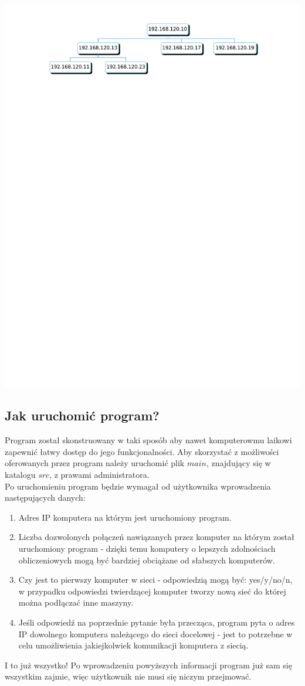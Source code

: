 \includegraphics[width=1.0\textwidth]{chart.jpg}

\subsection{Jak uruchomić program?}
Program został skonstruowany w taki sposób aby nawet komputerowmu laikowi zapewnić łatwy dostęp do jego funkcjonalności. Aby skorzystać z możliwości oferowanych przez program należy uruchomić plik $main$, znajdujący się w katalogu $src$, z prawami administratora.\\
\indent Po uruchomieniu program będzie wymagał od użytkownika wprowadzenia następujących danych:
\begin{enumerate}
\item Adres IP komputera na którym jest uruchomiony program.
\item Liczba dozwolonych połączeń nawiązanych przez komputer na którym został uruchomiony program - dzięki temu komputery o lepszych zdolnościach obliczeniowych mogą być bardziej obciążane od słabszych komputerów.
\item Czy jest to pierwszy komputer w sieci - odpowiedzią mogą być: yes/y/no/n, w przypadku odpowiedzi twierdzącej komputer tworzy nową sieć do której można podłączać inne maszyny.
\item Jeśli odpowiedź na poprzednie pytanie była przecząca, program pyta o adres IP dowolnego komputera należącego do sieci docelowej - jest to potrzebne w celu umożliwienia jakiejkolwiek komunikacji komputera z siecią.
\end{enumerate}
\indent I to już wszystko! Po wprowadzeniu powyższych informacji program już sam się wszystkim zajmie, więc użytkownik nie musi się niczym przejmować.

